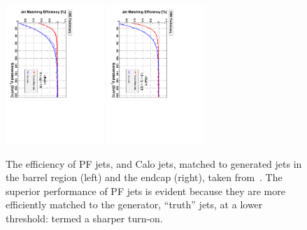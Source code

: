 \begin{figure}[htbp]
  \begin{center}
  \includegraphics[width=0.33\textwidth, angle =90]{Figures/detector/PFjetvsCalo0p1}
  \includegraphics[width=0.33\textwidth, angle =90]{Figures/detector/PFjetvsCalo0p1end}
  \caption{The efficiency of \ac{PF} jets, and Calo jets, matched to generated jets in the barrel region (left) and the endcap (right), taken from~\cite{PFT-09-001}. The superior performance of \ac{PF} jets is evident because they are more efficiently matched to the generator, ``truth'' jets, at a lower \pt threshold: termed a sharper turn-on.}
  \label{fig:PFturnOns}
  \end{center}
\end{figure}

